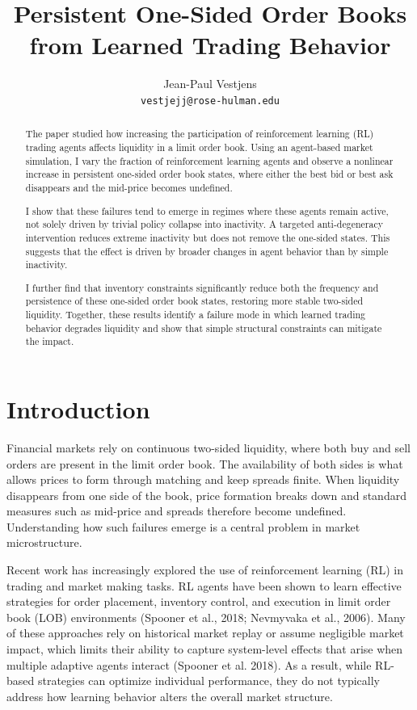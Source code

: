 \documentclass[11pt]{article}
\title{Persistent One-Sided Order Books from Learned Trading Behavior}
\author{Jean-Paul Vestjens \\ \texttt{vestjejj@rose-hulman.edu}}
\date{}
\begin{document}
\maketitle

\begin{abstract}
The paper studied how increasing the participation of reinforcement learning (RL) trading agents affects liquidity in a limit order book. Using an agent-based market simulation, I vary the fraction of reinforcement learning agents and observe a nonlinear increase in persistent one-sided order book states, where either the best bid or best ask disappears and the mid-price becomes undefined.

I show that these failures tend to emerge in regimes where these agents remain active, not solely driven by trivial policy collapse into inactivity. A targeted anti-degeneracy intervention reduces extreme inactivity but does not remove the one-sided states. This suggests that the effect is driven by broader changes in agent behavior than by simple inactivity.

I further find that inventory constraints significantly reduce both the frequency and persistence of these one-sided order book states, restoring more stable two-sided liquidity. Together, these results identify a failure mode in which learned trading behavior degrades liquidity and show that simple structural constraints can mitigate the impact.
\end{abstract}

\section{Introduction}

Financial markets rely on continuous two-sided liquidity, where both buy and sell orders are present in the limit order book. The availability of both sides is what allows prices to form through matching and keep spreads finite. When liquidity disappears from one side of the book, price formation breaks down and standard measures such as mid-price and spreads therefore become undefined. Understanding how such failures emerge is a central problem in market microstructure.

Recent work has increasingly explored the use of reinforcement learning (RL) in trading and market making tasks. RL agents have been shown to learn effective strategies for order placement, inventory control, and execution in limit order book (LOB) environments (Spooner et al., 2018; Nevmyvaka et al., 2006). Many of these approaches rely on historical market replay or assume negligible market impact, which limits their ability to capture system-level effects that arise when multiple adaptive agents interact (Spooner et al. 2018). As a result, while RL-based strategies can optimize individual performance, they do not typically address how learning behavior alters the overall market structure.
\end{document}
